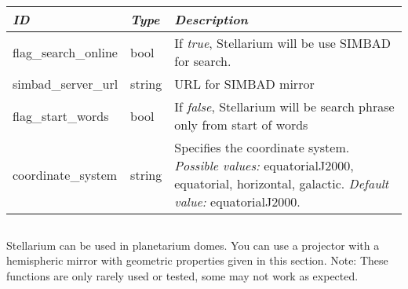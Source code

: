 \subsection{}

\begin{tabularx}{\textwidth}{l|l|X}\toprule
\emph{ID} & \emph{Type} & \emph{Description}\\\midrule
flag\_search\_online & bool   & If \emph{true}, Stellarium will be use SIMBAD for search.\\%
simbad\_server\_url  & string & URL for SIMBAD mirror\\%
flag\_start\_words   & bool   & If \emph{false}, Stellarium will be search phrase only from start of words\\%
coordinate\_system   & string & Specifies the coordinate system. 
                                \emph{Possible values:} equatorialJ2000, equatorial, horizontal, galactic. \emph{Default value:} equatorialJ2000.\\
\bottomrule
\end{tabularx}

\subsection{}

Stellarium can be used in planetarium domes. You can use a projector with a hemispheric mirror with geometric properties given in this section. 
Note: These functions are only rarely used or tested, some may not work as expected.
 
